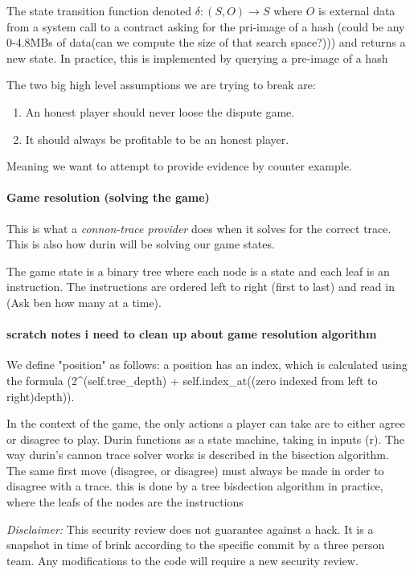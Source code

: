 The state transition function denoted $\delta: (S,O) \rightarrow S$ where $O$ is external data from a system call to a contract asking for the pri-image of a hash (could be any 0-4.8MBs of data(can we compute the size of that search space?))) and returns a new state. In practice, this is implemented by querying a pre-image of a hash

The two big high level assumptions we are trying to break are:
\begin{enumerate}
  \tightlist
  \item An honest player should never loose the dispute game.
  \item It should always be profitable to be an honest player.
\end{enumerate}
Meaning we want to attempt to provide evidence by counter example. 

\paragraph{Game resolution (solving the game)}

This is what a \emph{connon-trace provider} does when it solves for the correct trace. 
This is also how durin will be solving our game states.

The game state is a binary tree where each node is a state and each leaf is an instruction.
The instructions are ordered left to right (first to last) and read in (Ask ben how many at a time).

\paragraph{scratch notes i need to clean up about game resolution algorithm}
We define "position" as follows: a position has an index, which is calculated using the formula (2^(self.tree_depth) + self.index_at((zero indexed from left to right)depth)).

In the context of the game, the only actions a player can take are to either agree or disagree to play. Durin functions as a state machine, taking in inputs (r).
The way durin's cannon trace solver works is described in the bisection algorithm. The same first move (disagree, or disagree) must always be made in order to disagree with a trace.
this is done by a tree bisdection algorithm in practice, where the leafs of the nodes are the instructions 



\emph{Disclaimer:} This security review does not guarantee against a
hack. It is a snapshot in time of brink according to the specific commit
by a three person team. Any modifications to the code will require a new
security review.

